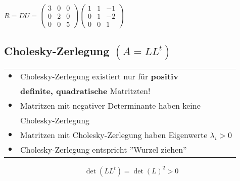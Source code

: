 			\vspace{0.3cm}
			
			$R = DU = \begin{pmatrix} 3 & 0 & 0 \\ 0 & 2 & 0 \\ 0 & 0 & 5  \end{pmatrix}  \begin{pmatrix} 1 & 1 & -1 \\ 0 & 1 & -2 \\ 0 & 0 & 1  \end{pmatrix}$
			
			
			\vfill\null
			\columnbreak
			
			
			
			\subsection{Cholesky-Zerlegung $(A = L L^t)$}
			\begin{tabular}{ll}
			$\bullet$ & Cholesky-Zerlegung existiert nur für \textbf{positiv} \\
			& \textbf{definite, quadratische} Matritzten! \\
			$\bullet$ & Matritzen mit negativer Determinante haben keine\\ 
			& Cholesky-Zerlegung \\
			$\bullet$ & Matritzen mit Cholesky-Zerlegung haben Eigenwerte $\lambda_i > 0$ \\
			$\bullet$ & Cholesky-Zerlegung entspricht ''Wurzel ziehen'' \\
			\end{tabular}
			
			$$\det(L L^t) = \det(L)^2 > 0 $$ 
			
